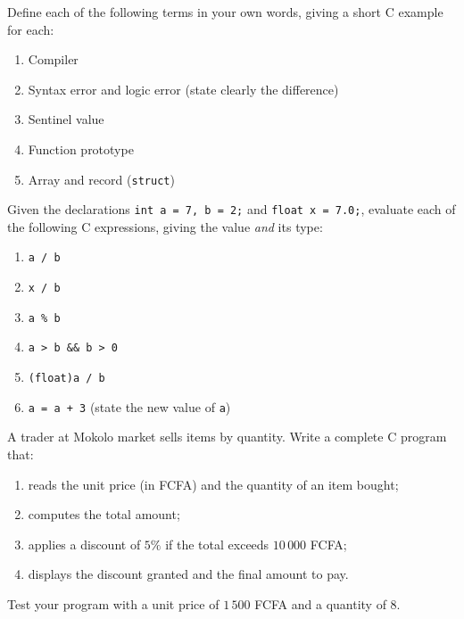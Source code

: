 \documentclass[11pt]{article}
\newcommand{\cle}[1]{{\popxbold\color{popdark}#1}}
\newcounter{popsec}
\newcounter{popsub}
\newcommand{\courssub}[1]{%
  \stepcounter{popsub}%
  \par\vspace{9pt}\noindent{\popxbold\fontsize{11.5}{13}\selectfont\color{popink}{\color{poporange}\thepopsec.\thepopsub}\hspace{6pt}#1}\par\nopagebreak\vspace{4pt}
}
\begin{document}
\begin{exercice}
Define each of the following terms in your own words, giving a short C example for each:
\begin{enumerate}
\item \cle{Compiler}
\item \cle{Syntax error} and \cle{logic error} (state clearly the difference)
\item \cle{Sentinel value}
\item \cle{Function prototype}
\item \cle{Array} and \cle{record} (\texttt{struct})
\end{enumerate}
\end{exercice}

\begin{exercice}
Given the declarations \texttt{int a = 7, b = 2;} and \texttt{float x = 7.0;}, evaluate each of the following C expressions, giving the value \emph{and} its type:
\begin{enumerate}
\item \texttt{a / b}
\item \texttt{x / b}
\item \texttt{a \% b}
\item \texttt{a > b \&\& b > 0}
\item \texttt{(float)a / b}
\item \texttt{a = a + 3} (state the new value of \texttt{a})
\end{enumerate}
\end{exercice}

\courssub{I practise}

\begin{exercice}
A trader at Mokolo market sells items by quantity. Write a complete C program that:
\begin{enumerate}
\item reads the unit price (in FCFA) and the quantity of an item bought;
\item computes the total amount;
\item applies a discount of $5\%$ if the total exceeds $10\,000$ FCFA;
\item displays the discount granted and the final amount to pay.
\end{enumerate}
Test your program with a unit price of $1\,500$ FCFA and a quantity of $8$.
\end{exercice}
\end{document}

